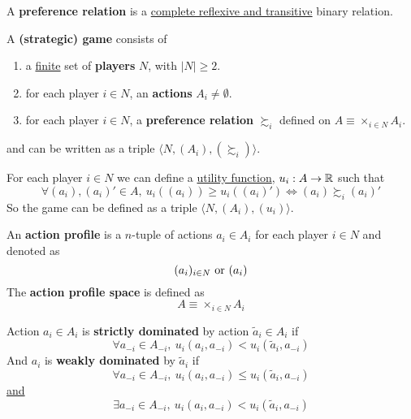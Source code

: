 \documentclass[11pt]{article}
\begin{document}
		\begin{definition}[pg.7]
			A \textbf{preference relation} is a \ul{complete reflexive and transitive} binary relation.
		\end{definition}
		
		\begin{definition}[11.1, lec.1]
			A \textbf{(strategic) game} consists of
			\begin{enumerate}[i]
				\item a \ul{finite} set of \textbf{players} $N$, with $|N| \geq 2$.
				\item for each player $i \in N$, an \textbf{actions} $A_i \neq \emptyset$.
				\item for each player $i \in N$, a \textbf{preference relation} $\succsim_i$ defined on $A \equiv \times_{i\in N}A_i$.
			\end{enumerate}
			and can be written as a triple $\langle N, (A_i), (\succsim_i) \rangle$.
		\end{definition}
		
		\begin{definition}
			For each player $i \in N$ we can define a \ul{utility function}, $u_i: A \to \mathbb{R}$ such that
			\begin{equation}
				\forall (a_i), (a_i)' \in A,\ u_i((a_i)) \geq u_i((a_i)') \iff (a_i) \succsim_i (a_i)'
			\end{equation}
			So the game can be defined as a triple $\langle N, (A_i), (u_i) \rangle$.
		\end{definition}
		
		\begin{definition}[lec.1]
			An \textbf{action profile} is a $n$-tuple of actions $a_i \in A_i$ for each player $i \in N$ and denoted as 
				\[
					(a_i)_{i \in N} \text{{ or }} (a_i)
				\]
			The \textbf{action profile space} is defined as 
				\[
					A \equiv \times_{i \in N} A_i
				\]
		\end{definition}
		
		\begin{definition}[lec.1]
			Action $a_i \in A_i$ is \textbf{strictly dominated} by action $\tilde{a}_i \in A_i$ if
			\[
				\forall a_{-i} \in A_{-i},\ u_i(a_i, a_{-i}) < u_i(\tilde{a}_i, a_{-i})
			\]
			And $a_i$ is \textbf{weakly dominated} by $\tilde{a}_i$ if
			\[
				\forall a_{-i} \in A_{-i},\ u_i(a_i, a_{-i}) \leq u_i(\tilde{a}_i, a_{-i})
			\]
			\ul{and}
			\[
				\exists a_{-i} \in A_{-i},\ u_i(a_i, a_{-i}) < u_i(\tilde{a}_i, a_{-i})
			\]
		\end{definition}
		
\end{document}
